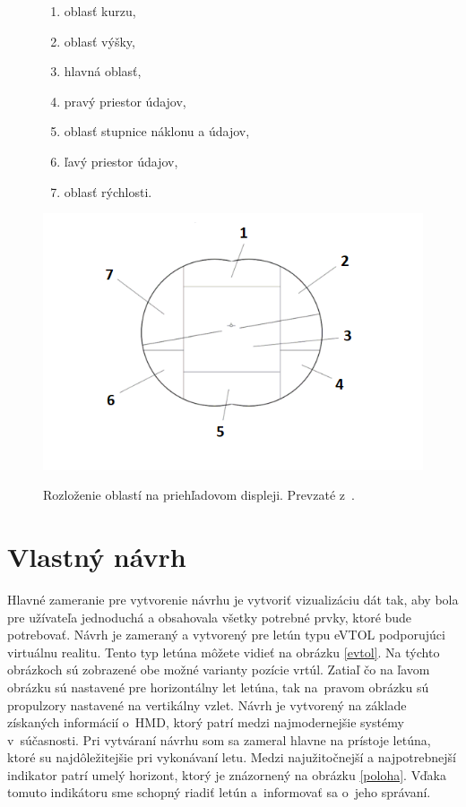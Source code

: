 \begin{figure}[h]
 \begin{minipage}{.48\textwidth}
 \centering
  \begin{enumerate}
    \item oblasť kurzu,
    \item oblasť výšky,
    \item hlavná oblasť,
    \item pravý priestor údajov,
    \item oblasť stupnice náklonu a údajov,
    \item ľavý priestor údajov,
    \item oblasť rýchlosti.
\end{enumerate}
  \end{minipage}%
  \hfill
  \begin{minipage}{.48\textwidth}
  \centering
  \includegraphics[scale=0.41]{obrazky-figures/oblastiHUD.png}
  \caption{Rozloženie oblastí na priehľadovom displeji. Prevzaté z~\cite{HUDkniha}.}{\label{oblasti}}
  \end{minipage}%
\end{figure}
\newpage

\section{Vlastný návrh}
Hlavné zameranie pre vytvorenie návrhu je vytvoriť vizualizáciu dát tak, aby bola pre užívateľa jednoduchá a obsahovala všetky potrebné prvky, ktoré bude potrebovať. Návrh je zameraný a vytvorený pre letún typu eVTOL podporujúci virtuálnu realitu. Tento typ letúna môžete vidieť na obrázku \ref{evtol}. Na týchto obrázkoch sú zobrazené obe možné varianty pozície vrtúl. Zatiaľ čo na ľavom obrázku sú nastavené pre horizontálny let letúna, tak na~pravom obrázku sú propulzory nastavené na vertikálny vzlet. Návrh je vytvorený na základe získaných informácií o~HMD, ktorý patrí medzi najmodernejšie systémy v~súčasnosti. Pri vytváraní návrhu som sa zameral hlavne na prístoje letúna, ktoré su najdôležitejšie pri vykonávaní letu. Medzi najužitočnejší a najpotrebnejší indikator patrí umelý horizont, ktorý je znázornený na obrázku \ref{poloha}. Vďaka tomuto indikátoru sme schopný riadiť letún a~informovať sa o~jeho správaní.

